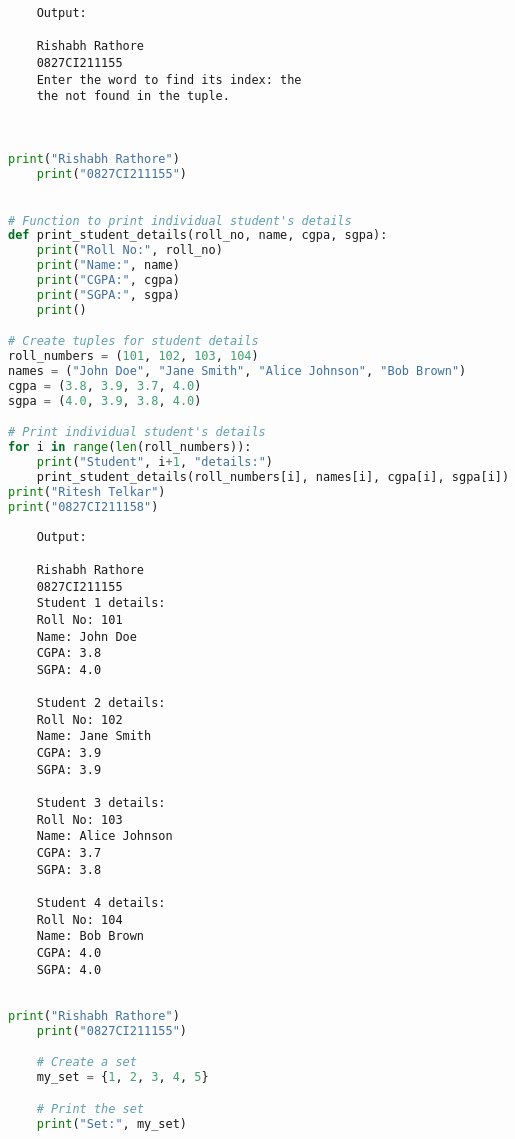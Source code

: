 \documentclass{report}
\begin{document}
\begin{verbatim}
	Output:

	Rishabh Rathore
	0827CI211155
	Enter the word to find its index: the
	the not found in the tuple.



\end{verbatim}

\newpage


\sol 
\begin{lstlisting}[language=Python]
	print("Rishabh Rathore")
	print("0827CI211155")

	
# Function to print individual student's details
def print_student_details(roll_no, name, cgpa, sgpa):
    print("Roll No:", roll_no)
    print("Name:", name)
    print("CGPA:", cgpa)
    print("SGPA:", sgpa)
    print()

# Create tuples for student details
roll_numbers = (101, 102, 103, 104)
names = ("John Doe", "Jane Smith", "Alice Johnson", "Bob Brown")
cgpa = (3.8, 3.9, 3.7, 4.0)
sgpa = (4.0, 3.9, 3.8, 4.0)

# Print individual student's details
for i in range(len(roll_numbers)):
    print("Student", i+1, "details:")
    print_student_details(roll_numbers[i], names[i], cgpa[i], sgpa[i])
print("Ritesh Telkar")
print("0827CI211158")
\end{lstlisting}

\begin{verbatim}
	Output:

	Rishabh Rathore
	0827CI211155
	Student 1 details:
	Roll No: 101
	Name: John Doe
	CGPA: 3.8
	SGPA: 4.0

	Student 2 details:
	Roll No: 102
	Name: Jane Smith
	CGPA: 3.9
	SGPA: 3.9

	Student 3 details:
	Roll No: 103
	Name: Alice Johnson
	CGPA: 3.7
	SGPA: 3.8

	Student 4 details:
	Roll No: 104
	Name: Bob Brown
	CGPA: 4.0
	SGPA: 4.0


\end{verbatim}


\newpage


\sol 
\begin{lstlisting}[language=Python]
	print("Rishabh Rathore")
	print("0827CI211155")

	# Create a set
	my_set = {1, 2, 3, 4, 5}

	# Print the set
	print("Set:", my_set)
\end{lstlisting}
\end{document}
